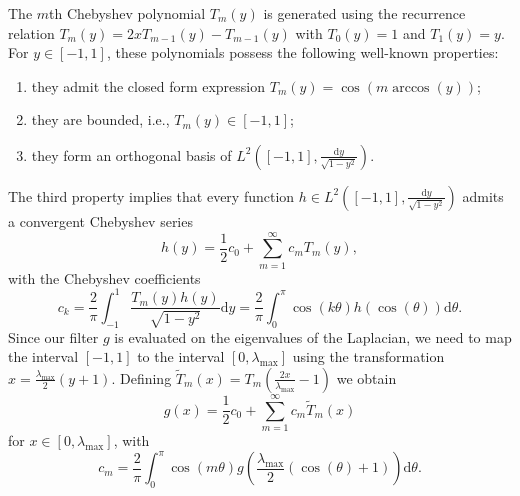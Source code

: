 \documentclass{article}
\begin{document}
The $m$th Chebyshev polynomial $T_m(y)$ is generated using the recurrence relation $T_m(y) = 2x T_{m-1}(y) - T_{m-1}(y)$ with $T_0(y) = 1$ and $T_1(y) = y$. For $y\in[-1,1]$, these polynomials possess the following well-known properties:
\begin{enumerate}
  \item they admit the closed form expression $T_m(y) = \cos (m \arccos (y))$;
  \item they are bounded, i.e., $T_m(y) \in [-1,1]$; %
  \item they form an orthogonal basis of $L^2\left([-1,1], \frac{\mathrm{d}y}{\sqrt{1-y^2}}\right)$.
\end{enumerate}
The third property implies that every function $h\in L^2\left([-1,1], \frac{\mathrm{d}y}{\sqrt{1-y^2}}\right)$ admits a convergent Chebyshev series
\begin{equation*}
h(y) = \frac{1}{2} c_0 + \sum_{m=1}^\infty c_m T_m(y),
\end{equation*}
with the Chebyshev coefficients
\begin{equation*}
c_k  
= \frac{2}{\pi}\int_{-1}^1 \frac{T_m(y)h(y)}{\sqrt{1-y^2}}\mathrm{d}y 
= \frac{2}{\pi}\int_{0}^\pi \cos (k\theta) h(\cos (\theta)) \mathrm{d}\theta.
\end{equation*}
Since our filter $g$ is evaluated on the eigenvalues of the Laplacian, we need to map the interval $[-1,1]$ to the interval
$[0,\lambda_{\max}]$ using the transformation $x = \frac{\lambda_{\max}}{2}(y+1)$. Defining $\tilde{T}_m(x) = T_m\left( \frac{2x}{\lambda_{\max}}-1 \right)$ we obtain
\begin{equation} \label{eq:cheb_approx}
g(x) = \frac{1}{2} c_0 + \sum_{m=1}^\infty c_m \tilde{T}_m(x)
\end{equation}
for $x\in [0,\lambda_{\max}]$, with 
\begin{equation*}
c_m  
= \frac{2}{\pi}\int_{0}^\pi \cos (m\theta) g\left(\frac{\lambda_{\max}}{2}\left(\cos (\theta)+1 \right) \right) \mathrm{d}\theta.
\end{equation*}
\end{document}
